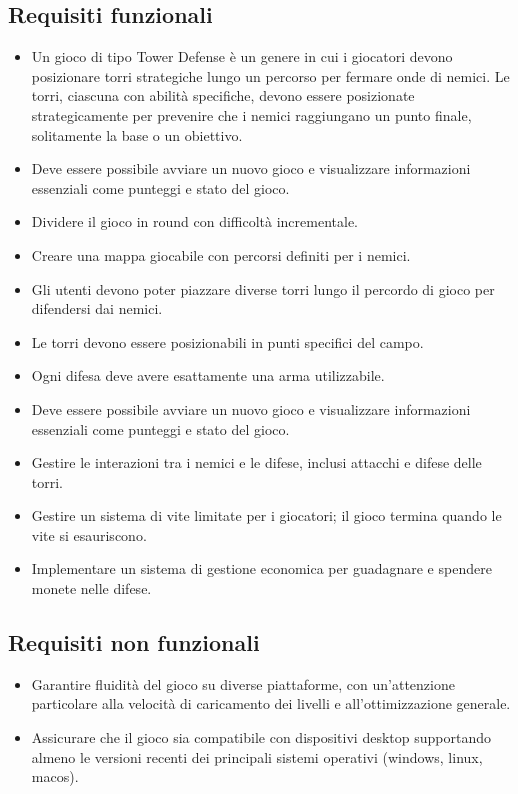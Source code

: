 \documentclass[a4paper,12pt]{report}
\begin{document}
\subsection*{Requisiti funzionali}
\begin{itemize}
	\item Un gioco di tipo Tower Defense è un genere in cui i giocatori devono posizionare torri strategiche lungo un percorso per fermare onde di nemici. Le torri, ciascuna con abilità specifiche, devono essere posizionate strategicamente per prevenire che i nemici raggiungano un punto finale, solitamente la base o un obiettivo.
	\item Deve essere possibile avviare un nuovo gioco e visualizzare informazioni essenziali come punteggi e stato del gioco.
	\item Dividere il gioco in round con difficoltà incrementale.
	\item Creare una mappa giocabile con percorsi definiti per i nemici.
	\item Gli utenti devono poter piazzare diverse torri lungo il percordo di gioco per difendersi dai nemici.
	\item Le torri devono essere posizionabili in punti specifici del campo.
	\item Ogni difesa deve avere esattamente una arma utilizzabile.
	\item Deve essere possibile avviare un nuovo gioco e visualizzare informazioni essenziali come punteggi e stato del gioco.
	\item Gestire le interazioni tra i nemici e le difese, inclusi attacchi e difese delle torri.
	\item Gestire un sistema di vite limitate per i giocatori; il gioco termina quando le vite si esauriscono.
	\item Implementare un sistema di gestione economica per guadagnare e spendere monete nelle difese.
\end{itemize}

\subsection*{Requisiti non funzionali}
\begin{itemize}
	\item Garantire fluidità del gioco su diverse piattaforme, con un'attenzione particolare alla velocità di caricamento dei livelli e all'ottimizzazione generale.
	\item Assicurare che il gioco sia compatibile con dispositivi desktop supportando almeno le versioni recenti dei principali sistemi operativi (windows, linux, macos).
\end{itemize}
\end{document}

